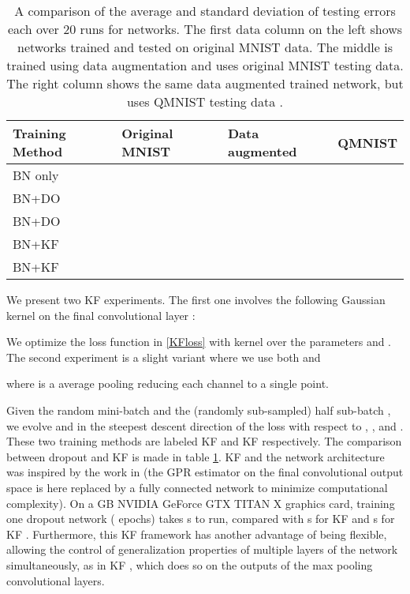\documentclass[11pt]{article}
\begin{document}
\begin{table}[h]
\begin{center}
\begin{tabular}{ | p{3.2cm} || p{3.2cm} | p{3.2cm} | p{3.2cm}|}
\hline
\textbf{Training Method} & \textbf{Original MNIST} & \textbf{Data augmented} & \textbf{QMNIST}\\
\hline
BN only &  &  & \\
\hline
BN+DO  &  &  &  \\
\hline
BN+DO  &  &  & \\
\hline
BN+KF  &  &  &  \\
\hline
BN+KF  &  &  &  \\
\hline
\end{tabular}
\end{center}
\caption{A comparison of the average and standard deviation of testing errors each over 20 runs for networks.  The first data column on the left shows networks trained and tested on original MNIST data.  The middle is trained using data augmentation and uses original MNIST testing data.  The right column shows the same data augmented trained network, but uses QMNIST testing data \cite{qmnist}. }\label{KFvsDO}
\end{table}

We present two KF experiments.  The first one involves the following Gaussian kernel on the final convolutional layer :

We optimize the loss function in \eqref{KFloss} with kernel  over the parameters  and .  The second experiment is a slight variant where we use both  and

where  is a  average pooling reducing each channel to a single point.

Given the random mini-batch  and the (randomly sub-sampled) half sub-batch , we evolve  and  in the steepest descent direction of the loss
{\small
}
with respect to , , and .  These two training methods are labeled KF  and KF  respectively.  The comparison between dropout and KF is made in table \ref{KFvsDO}.  KF  and the network architecture was inspired by the work in \cite[Sec. 10]{owhadi2019kernel} (the GPR estimator on the final convolutional output space is here replaced by a fully connected network to minimize computational complexity).  On a GB NVIDIA GeForce GTX TITAN X graphics card, training one dropout network ( epochs) takes s to run, compared with s for KF  and s for KF .   Furthermore, this KF framework has another advantage of being flexible, allowing the control of generalization properties of multiple layers of the network simultaneously, as in KF , which does so on the outputs of the max pooling convolutional layers.
\end{document}
